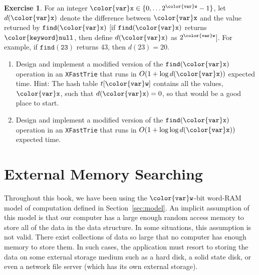 \documentclass[10pt]{book}
\newcommand{\chaplabel}[1]{\label{chap:#1}}
\newcommand{\secref}[1]{Section~\ref{sec:#1}}
\theoremstyle{plain}
\theoremstyle{definition}
\newtheorem{exc}{Exercise}[chapter]
\begin{document}
\begin{exc}
  For an integer $\ensuremath{\mathtt{{\color{var}x}}}\in\{0,\ldots2^{\ensuremath{\mathtt{{\color{var}w}}}}-1\}$, let $d(\ensuremath{\mathtt{{\color{var}x}}})$ denote
  the difference between \ensuremath{\mathtt{{\color{var}x}}} and the value returned by \ensuremath{\mathtt{find({\color{var}x})}}
  [if \ensuremath{\mathtt{find({\color{var}x})}} returns \ensuremath{\mathtt{{\color{keyword}null}}}, then define $d(\ensuremath{\mathtt{{\color{var}x}}})$ as $2^\ensuremath{\mathtt{{\color{var}w}}}$].
  For example, if \ensuremath{\mathtt{find(23)}} returns 43, then $d(23)=20$.
  \begin{enumerate}
    \item Design and implement a modified version of the \ensuremath{\mathtt{find({\color{var}x})}}
      operation in an \texttt{XFastTrie} that runs in $O(1+\log d(\ensuremath{\mathtt{{\color{var}x}}}))$
      expected time. Hint: The hash table $t[\ensuremath{\mathtt{{\color{var}w}}}]$ contains all the
      values, \ensuremath{\mathtt{{\color{var}x}}}, such that $d(\ensuremath{\mathtt{{\color{var}x}}})=0$, so that would be a good place
      to start.
    \item Design and implement a modified version of the \ensuremath{\mathtt{find({\color{var}x})}}
      operation in an  \texttt{XFastTrie} that runs in $O(1+\log\log d(\ensuremath{\mathtt{{\color{var}x}}}))$
      expected time.
  \end{enumerate}
\end{exc}



\clearpage

\clearpage
\chapter{External Memory Searching}
\chaplabel{btree}

Throughout this book, we have been using the \ensuremath{\mathtt{{\color{var}w}}}-bit word-RAM model
of computation defined in \secref{model}.   An implicit assumption of
this model is that our computer has a large enough random access memory
to store all of the data in the data structure.  In some situations,
this assumption is not valid.  There exist collections of data so large
that no computer has enough memory to store them.  In such cases, the
application must resort to storing the data on some external storage
medium such as a hard disk, a solid state disk, or even a network file
server (which has its own external storage).
\end{document}
